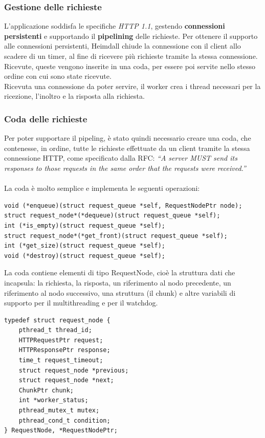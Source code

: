 \documentclass[italian]{tktltiki2}
\begin{document}
\subsubsection{Gestione delle richieste}
\label{sec:requests_management}
L'applicazione soddisfa le specifiche \emph{HTTP 1.1}\cite{http_1.1}, gestendo \textbf{connessioni persistenti}\cite{persistent_connections} e supportando il \textbf{pipelining}\cite{pipeling} delle richieste. Per ottenere il supporto alle connessioni persistenti, Heimdall chiude la connessione con il client allo scadere di un timer, al fine di ricevere più richieste tramite la stessa connessione. Ricevute, queste vengono inserite in una coda, per essere poi servite nello stesso ordine con cui sono state ricevute.
\\
Ricevuta una connessione da poter servire, il worker crea i thread necessari per la ricezione, l'inoltro e la risposta alla richiesta.

\subsubsection*{Coda delle richieste}
\label{sec:requests_queue}
Per poter supportare il pipeling, è stato quindi necessario creare una coda, che contenesse, in ordine, tutte le richieste effettuate da un client tramite la stessa connessione HTTP, come specificato dalla RFC: \emph{``A server MUST send its responses to those requests in the same order that the requests were received.''}\cite{pipeling}
\\\\La coda è molto semplice e implementa le seguenti operazioni:
\begin{lstlisting}
void (*enqueue)(struct request_queue *self, RequestNodePtr node);
struct request_node*(*dequeue)(struct request_queue *self);
int (*is_empty)(struct request_queue *self);
struct request_node*(*get_front)(struct request_queue *self);
int (*get_size)(struct request_queue *self);
void (*destroy)(struct request_queue *self);
\end{lstlisting}
La coda contiene elementi di tipo RequestNode, cioè la struttura dati che incapsula: la richiesta, la risposta, un riferimento al nodo precedente, un riferimento al nodo successivo, una struttura (il chunk) e altre variabili di supporto per il multithreading e per il watchdog.
\begin{lstlisting}
typedef struct request_node {
    pthread_t thread_id;
    HTTPRequestPtr request;
    HTTPResponsePtr response;
    time_t request_timeout;
    struct request_node *previous;
    struct request_node *next;
    ChunkPtr chunk;
    int *worker_status;
    pthread_mutex_t mutex;
    pthread_cond_t condition;
} RequestNode, *RequestNodePtr;
\end{lstlisting}
\end{document}
